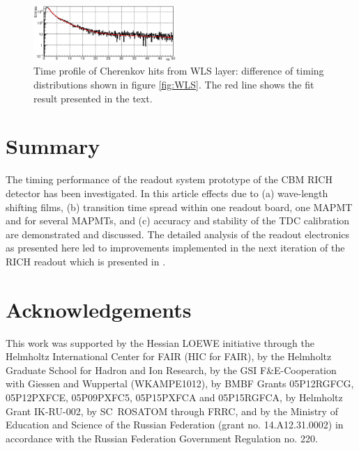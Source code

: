 \documentclass[final,5p,times,twocolumn]{elsarticle}
\begin{document}
\begin{figure}[h]
	\centering
	\includegraphics[width=0.48\textwidth]{figures/WLSdiff_1Nov.eps}
	\caption{Time profile of Cherenkov hits from WLS layer: difference of timing distributions shown in figure \ref{fig:WLS}. The red line shows the fit result presented in the text.}
	\label{fig:WLSdiff}
\end{figure}


\section{Summary}

The timing performance of the readout system prototype of the CBM RICH detector has been investigated. In this article effects due to (a) wave-length shifting films, (b) transition time spread within one readout board, one MAPMT and for several MAPMTs, and (c) accuracy and stability of the TDC calibration are demonstrated and discussed. The detailed analysis of the readout electronics as presented here led to improvements implemented in the next iteration of the RICH readout which is presented in \cite{PAULY}.


\section*{Acknowledgements}

This work was supported by the Hessian LOEWE initiative through the Helmholtz International Center for FAIR (HIC for FAIR), by the Helmholtz Graduate School for Hadron and Ion Research, by the GSI F\&E-Cooperation with Giessen and Wuppertal (WKAMPE1012), by BMBF Grants 05P12RGFCG, 05P12PXFCE, 05P09PXFC5, 05P15PXFCA and 05P15RGFCA, by Helmholtz Grant IK-RU-002, by SC~ROSATOM through FRRC, and by the Ministry of Education and Science of the Russian Federation (grant no. 14.A12.31.0002) in accordance with the Russian Federation Government Regulation no. 220.
\end{document}
